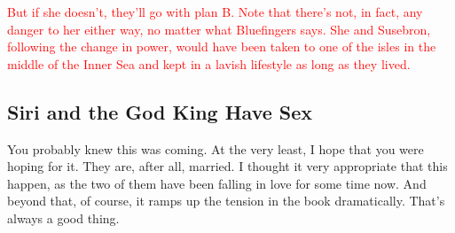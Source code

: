 \textcolor{red}{
But if she doesn’t, they’ll go with plan B. Note that there’s not, in fact, any danger to her either way, no matter what Bluefingers says. She and Susebron, following the change in power, would have been taken to one of the isles in the middle of the Inner Sea and kept in a lavish lifestyle as long as they lived.
}

\subsection*{Siri and the God King Have Sex}

You probably knew this was coming. At the very least, I hope that you were hoping for it. They are, after all, married. I thought it very appropriate that this happen, as the two of them have been falling in love for some time now. And beyond that, of course, it ramps up the tension in the book dramatically. That’s always a good thing.



